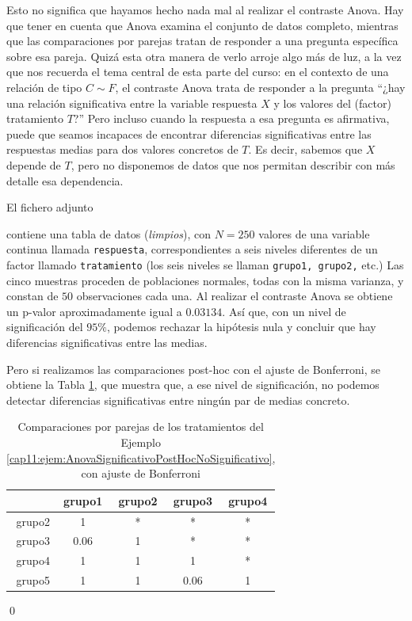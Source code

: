 Esto no significa que hayamos hecho nada mal al realizar el contraste Anova. Hay que tener en cuenta que Anova examina el conjunto de datos completo, mientras que las comparaciones por parejas tratan de responder a una pregunta específica sobre esa pareja. Quizá esta otra manera de verlo arroje algo más de luz, a la vez que nos recuerda el tema central de esta parte del curso: en el contexto de una relación de tipo $C \sim F$, el contraste Anova trata de responder a la pregunta ``¿hay una relación significativa entre la variable respuesta $X$ y los valores del (factor) tratamiento $T$?'' Pero incluso cuando la respuesta a esa pregunta es afirmativa, puede que seamos incapaces de encontrar diferencias significativas entre las respuestas medias para dos valores concretos de $T$. Es decir, sabemos que $X$ depende de $T$, pero no disponemos de datos que nos permitan describir con más detalle esa dependencia.

\begin{ejemplo}
\label{cap11:ejem:AnovaSignificativoPostHocNoSignificativo}
El fichero adjunto
\begin{center}
\end{center}
contiene una tabla de datos ({\em limpios}), con $N=250$ valores de una variable continua llamada {\tt respuesta}, correspondientes a seis niveles diferentes de un factor llamado {\tt tratamiento} (los seis niveles se llaman {\tt grupo1, grupo2,} etc.) Las cinco muestras proceden de poblaciones normales, todas con la misma varianza, y constan de $50$ observaciones cada una. Al realizar el contraste Anova se obtiene un p-valor aproximadamente igual a $0.03134$. Así que, con un nivel de significación del $95\%$, podemos rechazar la hipótesis nula y concluir que hay diferencias significativas entre las medias.

Pero si realizamos las comparaciones post-hoc con el ajuste de Bonferroni, se obtiene la Tabla \ref{cap11:tabla:AnovaSignificativoPostHocNoSignificativo}, que muestra que, a ese nivel de significación, no podemos detectar diferencias significativas entre ningún par de medias concreto.

\begin{table}[ht]
\centering
\begin{tabular}{|r|c|c|c|c|}
  \hline
 & grupo1 & grupo2 & grupo3 & grupo4 \\
  \hline
  grupo2 & 1 & * & * & * \\
  \hline
  grupo3 & 0.06 & 1 & * &*  \\
  \hline
  grupo4 & 1 & 1 & 1 &  *\\
  \hline
  grupo5 & 1 & 1 & 0.06 & 1 \\
   \hline
\end{tabular}
\caption{Comparaciones por parejas de los tratamientos del Ejemplo \ref{cap11:ejem:AnovaSignificativoPostHocNoSignificativo}, con ajuste de Bonferroni}
\label{cap11:tabla:AnovaSignificativoPostHocNoSignificativo}
\end{table}

\qed
\end{ejemplo}


